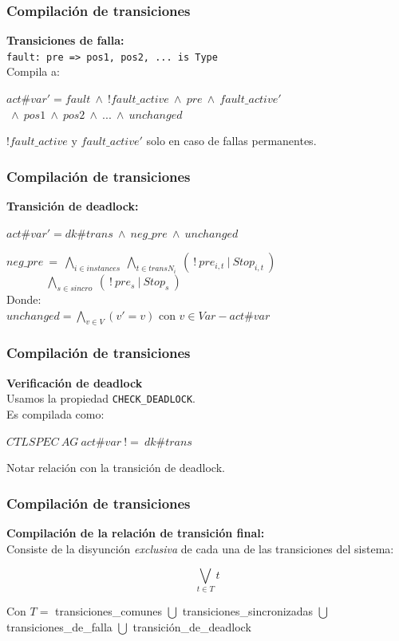 \documentclass[serif]{beamer}
\begin{document}
\begin{frame}
\frametitle{Compilación de transiciones}
\textbf{\Large Transiciones de falla:}\\[0.3cm]
\texttt{fault: pre => pos1, pos2, ... is Type}\\[0.3cm]
Compila a:
\begin{framed}
$act\#var' = fault~\wedge~!fault\_active~\wedge~pre~\wedge~fault\_active'$
$~\wedge~pos1~\wedge~pos2~\wedge~...~\wedge~unchanged$
\end{framed}
$!fault\_active$ y $fault\_active'$ solo en caso de fallas permanentes.
\end{frame}


\begin{frame}
\frametitle{Compilación de transiciones}
\textbf{\Large Transición de deadlock:}\\[0.3cm]
\begin{framed}
$act\#var' = dk\#trans~\wedge~neg\_pre~\wedge~unchanged$
\end{framed}
$neg\_pre~=~\bigwedge_{i \in instances}~\bigwedge_{t \in transN_i}~(~!~pre_{i,t}~|~Stop_{i,t}~)$\\[0.3cm]
$~~~~~~~~~~~~~~~~\bigwedge_{s \in sincro}~(~!~pre_s~|~Stop_s~)$\\[0.3cm]
Donde:\\[0.3cm]
$unchanged = \bigwedge_{v \in V}(v' = v) \text{ con } v \in Var - act\#var$
\end{frame}

\begin{frame}
\frametitle{Compilación de transiciones}
\textbf{\Large Verificación de deadlock}\\[0.3cm]
Usamos la propiedad \texttt{CHECK\_DEADLOCK}.\\[0.3cm]
Es compilada como:
\begin{framed}
$CTLSPEC~AG~act\#var~!=~dk\#trans$
\end{framed}
Notar relación con la transición de deadlock.
\end{frame}



\begin{frame}
\frametitle{Compilación de transiciones}
\textbf{\Large Compilación de la relación de transición final:}\\[0.3cm]
Consiste de la disyunción \textit{exclusiva} de cada una de las 
transiciones del sistema:
\begin{framed}
$$\bigvee_{t \in T} t $$
\end{framed}
Con $T =$ transiciones\_comunes $\bigcup$ transiciones\_sincronizadas 
$\bigcup$ transiciones\_de\_falla $\bigcup$ transición\_de\_deadlock
\end{frame}
\end{document}

